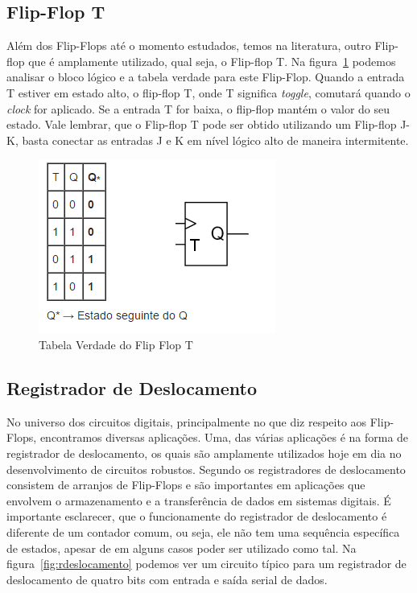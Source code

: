 \documentclass[12pt]{article}
\begin{document}
\subsection{Flip-Flop T}

Além dos Flip-Flops até o momento estudados, temos na literatura, outro Flip-flop que é amplamente utilizado, qual seja, o Flip-flop T. Na figura~\ref{fig:fft} podemos analisar o bloco lógico e a tabela verdade para este Flip-Flop. Quando a entrada T estiver em estado alto, o flip-flop T, onde T significa \textit{toggle}, comutará quando o \textit{clock} for aplicado. Se a entrada T for baixa, o flip-flop mantém o valor do seu estado. Vale lembrar, que o Flip-flop T pode ser obtido utilizando um Flip-flop J-K, basta conectar as entradas J e K em nível lógico alto de maneira intermitente.  

\begin{figure}[!htbp]
\centering
\includegraphics[width=.5\textwidth]{img/p4/fig4Flip-Flopt.png}
\caption{Tabela Verdade do Flip Flop T}
\label{fig:fft}
\end{figure}

\subsection{Registrador de Deslocamento}

No universo dos circuitos digitais, principalmente no que diz respeito aos Flip-Flops, encontramos diversas aplicações. Uma, das várias aplicações é na forma de registrador de deslocamento, os quais são amplamente utilizados hoje em dia no desenvolvimento de circuitos robustos. Segundo \cite{floyd2011digital} os registradores de deslocamento consistem de arranjos de Flip-Flops e são importantes em aplicações que envolvem o armazenamento e a transferência de dados em sistemas digitais. É importante esclarecer, que o funcionamente do registrador de deslocamento é diferente de um contador comum, ou seja, ele não tem uma sequência específica de estados, apesar de em alguns casos poder ser utilizado como tal. Na figura~\ref{fig:rdeslocamento} podemos ver um circuito típico para um registrador de deslocamento de quatro bits com entrada e saída serial de dados.
\end{document}
